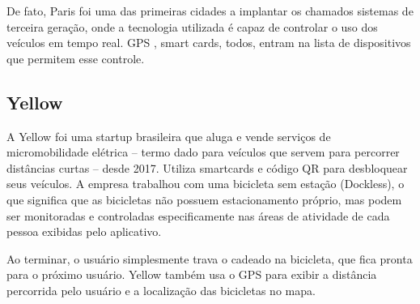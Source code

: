De fato, Paris foi uma das primeiras cidades a implantar os chamados sistemas de terceira geração, onde a tecnologia utilizada é capaz de controlar o uso dos veículos em tempo real. GPS , smart cards, todos, entram na lista de dispositivos que permitem esse controle.

\subsection{Yellow}

A Yellow foi uma startup brasileira que aluga e vende serviços de micromobilidade elétrica -- termo dado para veículos que servem para percorrer distâncias curtas -- desde 2017. Utiliza smartcards e código QR para desbloquear seus veículos. A empresa trabalhou com uma bicicleta sem estação (Dockless), o que significa que as bicicletas não possuem estacionamento próprio, mas podem ser monitoradas e controladas especificamente nas áreas de atividade de cada pessoa exibidas pelo aplicativo.

Ao terminar, o usuário simplesmente trava o cadeado na bicicleta, que fica pronta para o próximo usuário. Yellow também usa o GPS para exibir a distância percorrida pelo usuário e a localização das bicicletas no mapa. %


